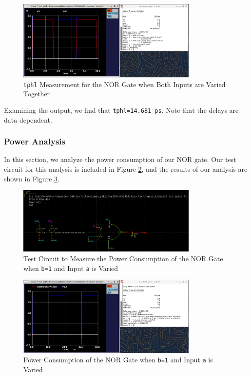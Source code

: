 \documentclass[fleqn]{article}
\begin{document}
	\begin{figure}[H]
		\centerline{\includegraphics[width=0.8\textwidth]{nor_delay_sweep_va_vb.png}}
		\caption{\texttt{tphl} Measurement for the NOR Gate when Both Inputs are Varied Together}
		\label{fig::nor_delay_sweep_va_vb}
	\end{figure}
	
	Examining the output, we find that \texttt{tphl=14.681 ps}. Note that the delays are data dependent.
	
	\subsubsection{Power Analysis}
	
	In this section, we analyze the power consumption of our NOR gate. Our test circuit for this analysis is included in Figure \ref{fig::nor_power_test_sweep_va}, and the results of our analysis are shown in Figure \ref{fig::nor_power_sweep_va}.
	
	\begin{figure}[H]
		\centerline{\includegraphics[width=0.8\textwidth]{nor_power_test_sweep_va.png}}
		\caption{Test Circuit to Measure the Power Consumption of the NOR Gate when \texttt{b=1} and Input \texttt{a} is Varied}
		\label{fig::nor_power_test_sweep_va}
	\end{figure}
	
	\begin{figure}[H]
		\centerline{\includegraphics[width=0.8\textwidth]{nor_power_sweep_va.png}}
		\caption{Power Consumption of the NOR Gate when \texttt{b=1} and Input \texttt{a} is Varied}
		\label{fig::nor_power_sweep_va}
	\end{figure}
	
\end{document}
